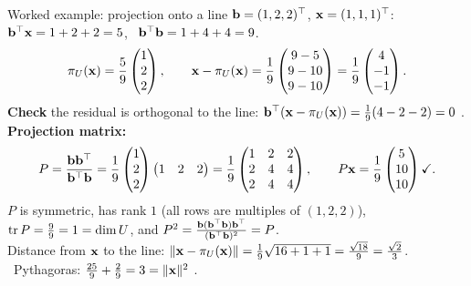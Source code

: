 \documentclass[aspectratio=1610,11pt]{beamer}
\begin{document}
\begin{frame}{Worked example: projection onto a line}
    \small
    $\mathbf{b} = (1, 2, 2)^\top$, $\mathbf{x} = (1, 1, 1)^\top$: \ $\mathbf{b}^\top\mathbf{x} = 1 + 2 + 2 = 5$, \ $\mathbf{b}^\top\mathbf{b} = 1 + 4 + 4 = 9$.
    \[\pi_U(\mathbf{x}) = \frac{5}{9}\begin{pmatrix} 1 \\ 2 \\ 2 \end{pmatrix}, \qquad \mathbf{x} - \pi_U(\mathbf{x}) = \frac{1}{9}\begin{pmatrix} 9 - 5 \\ 9 - 10 \\ 9 - 10 \end{pmatrix} = \frac{1}{9}\begin{pmatrix} 4 \\ -1 \\ -1 \end{pmatrix}.\]
    \textbf{Check} the residual is orthogonal to the line: $\mathbf{b}^\top(\mathbf{x} - \pi_U(\mathbf{x})) = \frac{1}{9}(4 - 2 - 2) = 0$ \checkmark.
    \\[0.4em]
    \textbf{Projection matrix:}
    \[P = \frac{\mathbf{b}\mathbf{b}^\top}{\mathbf{b}^\top\mathbf{b}} = \frac{1}{9}\begin{pmatrix} 1 \\ 2 \\ 2 \end{pmatrix}\begin{pmatrix} 1 & 2 & 2 \end{pmatrix} = \frac{1}{9}\begin{pmatrix} 1 & 2 & 2 \\ 2 & 4 & 4 \\ 2 & 4 & 4 \end{pmatrix}, \qquad P\mathbf{x} = \frac{1}{9}\begin{pmatrix} 5 \\ 10 \\ 10 \end{pmatrix} \checkmark.\]
    $P$ is symmetric, has rank $1$ (all rows are multiples of $(1, 2, 2)$), $\operatorname{tr} P = \frac{9}{9} = 1 = \dim U$, and $P^2 = \frac{\mathbf{b}(\mathbf{b}^\top\mathbf{b})\mathbf{b}^\top}{(\mathbf{b}^\top\mathbf{b})^2} = P$.
    \\[0.4em]
    Distance from $\mathbf{x}$ to the line: $\lVert \mathbf{x} - \pi_U(\mathbf{x}) \rVert = \frac{1}{9}\sqrt{16 + 1 + 1} = \frac{\sqrt{18}}{9} = \frac{\sqrt2}{3}$. \ Pythagoras: $\frac{25}{9} + \frac{2}{9} = 3 = \lVert \mathbf{x} \rVert^2$ \checkmark.
\end{frame}
\end{document}
